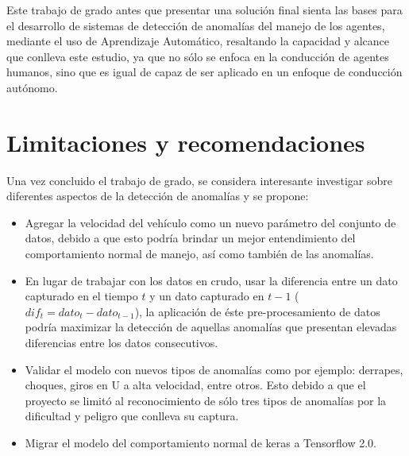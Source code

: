 Este trabajo de grado antes que presentar una soluci\'{o}n final sienta las bases para el desarrollo de sistemas de detecci\'{o}n de anomal\'{i}as del manejo de los agentes, mediante el uso de Aprendizaje Autom\'{a}tico, resaltando la capacidad y alcance que conlleva este estudio, ya que no s\'{o}lo se enfoca en la conducci\'{o}n de agentes humanos, sino que es igual de capaz de ser aplicado en un enfoque de conducci\'{o}n aut\'{o}nomo.

\section{Limitaciones y recomendaciones}

Una vez concluido el trabajo de grado, se considera interesante investigar sobre diferentes aspectos de la detecci\'{o}n de anomal\'{i}as y se propone:

\begin{itemize}
\item Agregar la velocidad del veh\'{i}culo como un nuevo par\'{a}metro del conjunto de datos, debido a que esto podr\'{i}a brindar un mejor entendimiento del comportamiento normal de manejo, as\'{i} como tambi\'{e}n de las anomal\'{i}as.
\item En lugar de trabajar con los datos en crudo, usar la diferencia entre un dato capturado en el tiempo $t$ y un dato capturado en $t-1$ ($dif_{t} = dato_{t}-dato_{t-1}$), la aplicaci\'{o}n de \'{e}ste pre-procesamiento de datos podr\'{i}a maximizar la detecci\'{o}n de aquellas anomal\'{i}as que presentan elevadas diferencias entre los datos consecutivos.
\item Validar el modelo con nuevos tipos de anomal\'{i}as como por ejemplo: derrapes, choques, giros en U a alta velocidad, entre otros. Esto debido a que el proyecto se limit\'{o} al reconocimiento de s\'{o}lo tres tipos de anomal\'{i}as por la dificultad y peligro que conlleva su captura.
\item Migrar el modelo del comportamiento normal de keras a Tensorflow 2.0.

\end{itemize}

 
